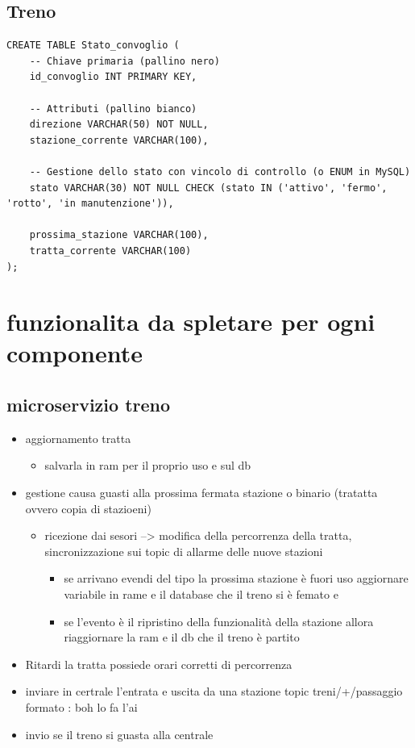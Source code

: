 \documentclass[11pt]{article}
\begin{document}
\subsection{Treno}
\label{sec:orgd3a1e8e}
\begin{verbatim}
CREATE TABLE Stato_convoglio (
    -- Chiave primaria (pallino nero)
    id_convoglio INT PRIMARY KEY,

    -- Attributi (pallino bianco)
    direzione VARCHAR(50) NOT NULL,
    stazione_corrente VARCHAR(100),

    -- Gestione dello stato con vincolo di controllo (o ENUM in MySQL)
    stato VARCHAR(30) NOT NULL CHECK (stato IN ('attivo', 'fermo', 'rotto', 'in manutenzione')),

    prossima_stazione VARCHAR(100),
    tratta_corrente VARCHAR(100)
);
\end{verbatim}
\section{funzionalita da spletare per ogni componente}
\label{sec:org3723909}
\subsection{microservizio treno}
\label{sec:orgcdd0303}
\begin{itemize}
\item aggiornamento tratta
\begin{itemize}
\item salvarla in ram per il proprio uso e sul db
\end{itemize}
\item gestione causa guasti alla prossima fermata stazione o binario (tratatta ovvero copia di stazioeni)
\begin{itemize}
\item ricezione dai sesori --> modifica della percorrenza della tratta, sincronizzazione sui topic di allarme delle
nuove stazioni
\begin{itemize}
\item se arrivano evendi del tipo la prossima stazione è fuori uso aggiornare variabile in rame e il database
che il treno si è femato e
\item se l'evento è il ripristino della funzionalità della stazione allora riaggiornare la ram e il db che il
treno è partito
\end{itemize}
\end{itemize}
\item Ritardi la tratta possiede orari corretti di percorrenza
\item inviare in certrale l'entrata e uscita da una stazione topic treni/+/passaggio
formato : boh lo fa l'ai
\item invio se il treno si guasta alla centrale
\end{itemize}
\end{document}
